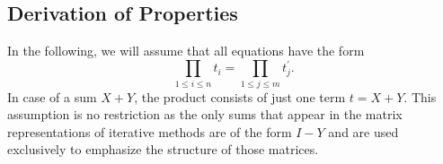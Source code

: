 
\subsection{Derivation of Properties}
\label{sec:propertyDerivation:Derivation}

In the following, we will assume that all equations have the form
%
$$\prod_{1 \leq i \leq n} t_i =\prod_{1 \leq j \leq m} t^\prime_j \text{.}$$
%
In case of a sum $X + Y$, the product consists of just one term $t = X + Y$. This assumption is no restriction as the only sums that appear in the matrix representations of iterative methods are of the form $I - Y$ and are used exclusively to emphasize the structure of those matrices.

